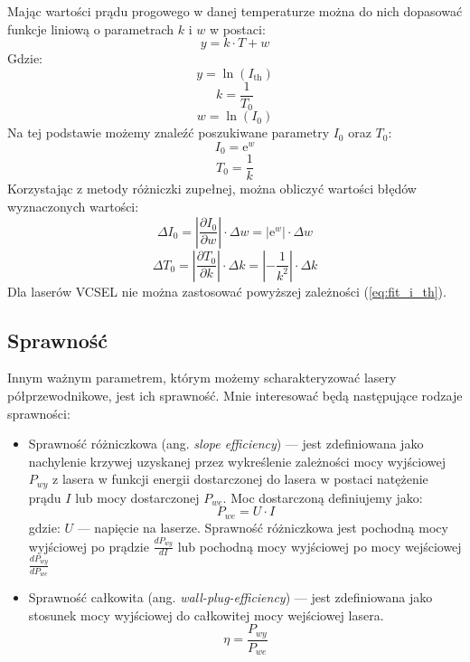 Mając wartości prądu progowego w danej temperaturze można do nich dopasować funkcje liniową o parametrach $k$ i $w$ w postaci:
\begin{equation}
y = k \cdot T + w
\end{equation}
Gdzie:
\begin{equation}
y = \ln(I_{\mathrm{th}})
\end{equation}
\begin{equation}
k = \frac{1}{T_0}
\end{equation}
\begin{equation}
w = \ln(I_0)
\end{equation}
Na tej podstawie możemy znaleźć poszukiwane parametry $I_0$ oraz $T_0$:
\begin{equation}
I_0 = \mathrm{e}^w
\end{equation}
\begin{equation}
T_0 = \frac{1}{k}
\end{equation}
Korzystając z metody różniczki zupełnej, można obliczyć wartości błędów wyznaczonych wartości:
\begin{equation}
\Delta I_0 = \left\lvert \frac{\partial I_{0}}{\partial w} \right\rvert \cdot \Delta w = | \mathrm{e}^w | \cdot \Delta w
\end{equation}
\begin{equation}
\Delta T_0 = \left\lvert \frac{\partial T_{0}}{\partial k} \right\rvert \cdot \Delta k = \left\lvert -\frac{1}{k^2} \right\rvert \cdot \Delta k
\end{equation}
Dla laserów VCSEL nie można zastosować powyższej zależności (\ref{eq:fit_i_th}).
\subsection{Sprawność}
Innym ważnym parametrem, którym możemy scharakteryzować lasery półprzewodnikowe, jest ich sprawność. Mnie interesować będą
następujące rodzaje sprawności:
\begin{itemize}
\item Sprawność różniczkowa (ang. \textit{slope efficiency}) --- jest zdefiniowana jako nachylenie krzywej uzyskanej przez wykreślenie zależności
mocy wyjściowej $P_{wy}$ z lasera w funkcji energii dostarczonej do lasera w postaci natężenie prądu $I$ lub mocy dostarczonej $P_{we}$.
Moc dostarczoną definiujemy jako:
\begin{equation}
P_{we} = U \cdot I
\end{equation}
gdzie: $U$ --- napięcie na laserze.
Sprawność różniczkowa jest pochodną mocy wyjściowej po prądzie $\frac{dP_{wy}}{dI}$ lub pochodną mocy wyjściowej po mocy wejściowej $\frac{dP_{wy}}{dP_{we}}$
\item Sprawność całkowita (ang. \textit{wall-plug-efficiency}) --- jest zdefiniowana jako stosunek mocy wyjściowej do całkowitej mocy wejściowej lasera.
\begin{equation}
\eta = \frac{P_{wy}}{P_{we}}
\end{equation}
\end{itemize}